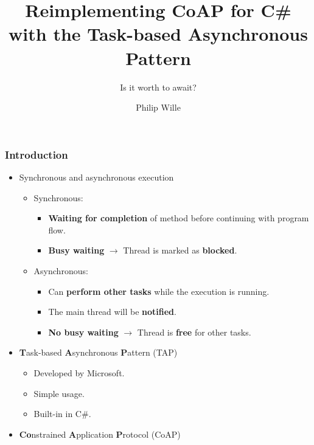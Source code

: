 \documentclass[11pt,t,usepdftitle=false,aspectratio=169,usenames,dvipsnames]{beamer}
\title{Reimplementing CoAP for C\# with the Task-based Asynchronous Pattern}
\subtitle{Is it worth to await?}
\author{Philip Wille}
\begin{document}
    \maketitle{}

    \begin{frame}
        \frametitle{Introduction}
        \begin{itemize}
            \item<1-> Synchronous and asynchronous execution
            \begin{itemize}
                \item<2-> Synchronous:
                \begin{itemize}
                    \item<3-> \textcolor{uibkBlue}{\textbf{Waiting for completion}} of method before continuing with program flow.
                    \item<5-> \textcolor{uibkBlue}{\textbf{Busy waiting}} $\rightarrow$ Thread is marked as \textcolor{uibkBlue}{\textbf{blocked}}.
                \end{itemize}
                \item<2-> Asynchronous:
                \begin{itemize}
                    \item<4-> Can \textcolor{uibkBlue}{\textbf{perform other tasks}} while the execution is running.
                    \item<6-> The main thread will be \textcolor{uibkBlue}{\textbf{notified}}.
                    \item<7-> \textcolor{uibkBlue}{\textbf{No busy waiting}} $\rightarrow$ Thread is \textcolor{uibkBlue}{\textbf{free}} for other tasks.
                \end{itemize}
            \end{itemize}
            \item<8-> \textcolor{uibkBlue}{\textbf{T}}ask-based \textcolor{uibkBlue}{\textbf{A}}synchronous \textcolor{uibkBlue}{\textbf{P}}attern (TAP)
            \begin{itemize}
                \item<9-> Developed by Microsoft.
                \item<10-> Simple usage.
                \item<11-> Built-in in C\#.
            \end{itemize}
            \item<12-> \textcolor{uibkBlue}{\textbf{Co}}nstrained \textcolor{uibkBlue}{\textbf{A}}pplication \textcolor{uibkBlue}{\textbf{P}}rotocol (CoAP)

\end{itemize}
\end{frame}
\end{document}
